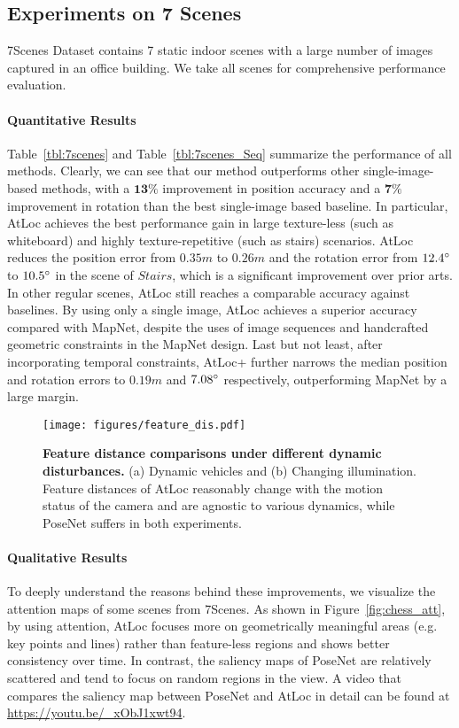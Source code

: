 \documentclass[letterpaper]{article}
\begin{document}
\subsection{Experiments on 7 Scenes}
7Scenes Dataset contains 7 static indoor scenes with a large number of images captured in an office building. We take all scenes for comprehensive performance evaluation. 

\paragraph{Quantitative Results} Table~\ref{tbl:7scenes} and Table~\ref{tbl:7scenes_Seq} summarize the performance of all methods. Clearly, we can see that our method outperforms other single-image-based methods, with a $\mathbf{13\%}$ improvement in position accuracy and a $\mathbf{7\%}$ improvement in rotation than the best single-image based baseline. In particular, AtLoc achieves the best performance gain in large texture-less (such as whiteboard) and highly texture-repetitive (such as stairs) scenarios. AtLoc reduces the position error from $0.35m$ to $0.26m$ and the rotation error from $12.4\degree$ to $10.5\degree$ in the scene of $Stairs$, which is a significant improvement over prior arts. In other regular scenes, AtLoc still reaches a comparable accuracy against baselines. By using only a single image, AtLoc achieves a superior accuracy compared with MapNet, despite the uses of image sequences and handcrafted geometric constraints in the MapNet design. Last but not least, after incorporating temporal constraints, AtLoc+ further narrows the median position and rotation errors to $0.19m$ and $7.08\degree$ respectively, outperforming MapNet by a large margin.
\begin{figure*}[t]
    \centering
    \texttt{[image: figures/feature\_dis.pdf]}
    \vspace{-0.3cm}
    \caption{\textbf{Feature distance comparisons under different dynamic disturbances.} (a) Dynamic vehicles and (b) Changing illumination. Feature distances of AtLoc reasonably change with the motion status of the camera and are agnostic to various dynamics, while PoseNet suffers in both experiments.}
    \label{fig:feature_distance}
\vspace{-0.5cm}
\end{figure*}
\paragraph{Qualitative Results} To deeply understand the reasons behind these improvements, we visualize the attention maps of some scenes from 7Scenes. As shown in Figure~\ref{fig:chess_att}, by using attention, AtLoc focuses more on geometrically meaningful areas (e.g. key points and lines) rather than feature-less regions and shows better consistency over time. In contrast, the saliency maps of PoseNet are relatively scattered and tend to focus on random regions in the view. A video that compares the saliency map between PoseNet and AtLoc in detail can be found at \url{https://youtu.be/_xObJ1xwt94}.
\end{document}
